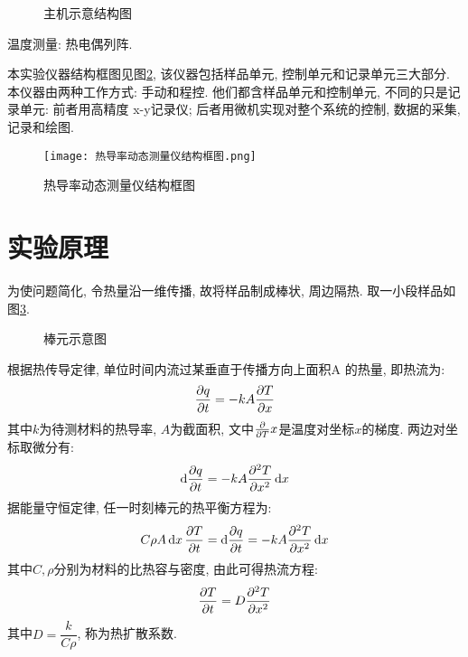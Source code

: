 \documentclass[11pt]{article}
\begin{document}
\begin{figure}[htb]
	\centering
	\caption{主机示意结构图}
	\label{fig:structure measure}
\end{figure}


温度测量: 热电偶列阵.

本实验仪器结构框图见图\ref{fig:structure measure}, 该仪器包括样品单元, 控制单元和记录单元三大部分. 本仪器由两种工作方式: 手动和程控. 他们都含样品单元和控制单元, 不同的只是记录单元: 前者用高精度 x-y记录仪; 后者用微机实现对整个系统的控制, 数据的采集, 记录和绘图.

\begin{figure}[htbp] 
	\label{fig:structure measure}
	\centering
	\texttt{[image: 热导率动态测量仪结构框图.png]}
	\caption{热导率动态测量仪结构框图}
\end{figure}


	\section{实验原理}

为使问题简化, 令热量沿一维传播, 故将样品制成棒状, 周边隔热. 取一小段样品如图\ref{fig:difx}.

\begin{figure}[!h] \label{fig:difx}
	\centering
	\caption{棒元示意图}
\end{figure}


根据热传导定律, 单位时间内流过某垂直于传播方向上面积A 的热量, 即热流为:
\[
\pdv {q}{t} = -kA \pdv {T}{x}
\]
其中$k$为待测材料的热导率, $A$为截面积, 文中$\pdv Tx$是温度对坐标$x$的梯度. 两边对坐标取微分有:
\[
\dd{\pdv {q}{t}} = -kA \pdv[2]{T}{x}\dd{x}
\]
据能量守恒定律, 任一时刻棒元的热平衡方程为:
\[
C\rho A\dd{x}\pdv {T}{t} = \dd{\pdv{q}{t}}  = -kA \pdv[2]{T}{x}\dd {x}
\]
其中$C,\rho$分别为材料的比热容与密度, 由此可得热流方程:
\[
\pdv {T}{t} = D\pdv[2]{T}{x}
\]
其中$D = \dfrac{k}{C\rho}$, 称为热扩散系数.
\end{document}
